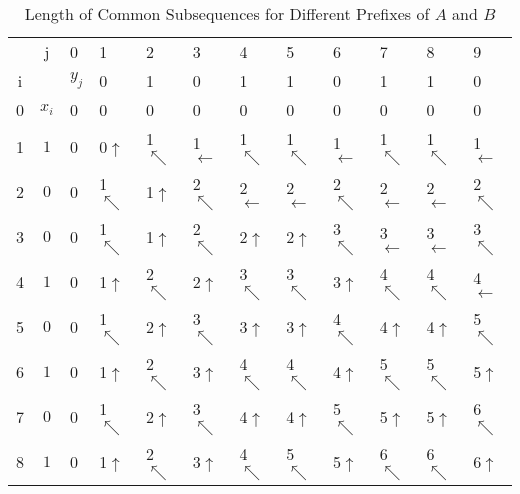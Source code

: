 \begin{table}[H]\centering
\begin{tabular}{c c l l l l l l l l l l}
& j & 0       & 1 & 2 & 3 & 4 & 5 & 6 & 7 & 8 & 9\\
i & & $y_j$   & 0 & 1 & 0 & 1 & 1 & 0 & 1 & 1 & 0\\\cline{3-12}
0 & $x_i$ & 0 & 0\cellcolor{gray!25} & 0 & 0 & 0 & 0 & 0 & 0 & 0 & 0\\
1 & $1$ & 0 & 0$\uparrow$ & 1$\nwarrow$\cellcolor{gray!25} & 1$\leftarrow$ & 1$\nwarrow$ & 1$\nwarrow$ & 1$\leftarrow$ & 1$\nwarrow$ & 1$\nwarrow$ & 1$\leftarrow$ \\
2 & $0$ & 0 & 1$\nwarrow$ & 1$\uparrow$ & 2$\nwarrow$\cellcolor{gray!25} & 2$\leftarrow$\cellcolor{gray!25} & 2$\leftarrow$\cellcolor{gray!25} & 2$\nwarrow$ & 2$\leftarrow$ & 2$\leftarrow$ & 2$\nwarrow$\\
3 & $0$ & 0 & 1$\nwarrow$ & 1$\uparrow$ & 2$\nwarrow$ & 2$\uparrow$ & 2$\uparrow$ & 3$\nwarrow$\cellcolor{gray!25} & 3$\leftarrow$ & 3$\leftarrow$ & 3$\nwarrow$\\
4 & $1$ & 0 & 1$\uparrow$ & 2$\nwarrow$ & 2$\uparrow$ & 3$\nwarrow$ & 3$\nwarrow$ & 3$\uparrow$ & 4$\nwarrow$\cellcolor{gray!25} & 4$\nwarrow$ & 4$\leftarrow$\\
5 & $0$ & 0 & 1$\nwarrow$ & 2$\uparrow$ & 3$\nwarrow$ & 3$\uparrow$ & 3$\uparrow$ & 4$\nwarrow$ & 4$\uparrow$\cellcolor{gray!25} & 4$\uparrow$ & 5$\nwarrow$\\
6 & $1$ & 0 & 1$\uparrow$ & 2$\nwarrow$ & 3$\uparrow$ & 4$\nwarrow$ & 4$\nwarrow$ & 4$\uparrow$ & 5$\nwarrow$ & 5$\nwarrow$\cellcolor{gray!25} & 5$\uparrow$\\
7 & $0$ & 0 & 1$\nwarrow$ & 2$\uparrow$ & 3$\nwarrow$ & 4$\uparrow$ & 4$\uparrow$ & 5$\nwarrow$ & 5$\uparrow$ & 5$\uparrow$ & 6$\nwarrow$\cellcolor{gray!25}\\
8 & $1$ & 0 & 1$\uparrow$ & 2$\nwarrow$ & 3$\uparrow$ & 4$\nwarrow$ & 5$\nwarrow$ & 5$\uparrow$ & 6$\nwarrow$ & 6$\nwarrow$ & 6$\uparrow$\cellcolor{gray!25}\\\cline{3-12}
\end{tabular}
\caption{Length of Common Subsequences for Different Prefixes of $A$ and $B$}\label{tab11}
\end{table}
